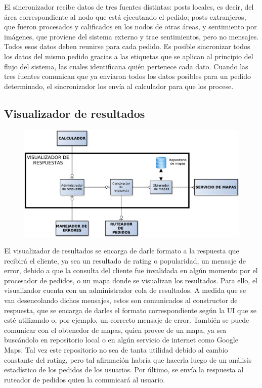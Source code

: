 El sincronizador recibe datos de tres fuentes distintas: posts locales, es decir, del área correspondiente al nodo que está ejecutando el pedido; posts extranjeros, que fueron procesados y calificados en los nodos de otras áreas, y sentimiento por imágenes, que proviene del sistema externo y trae sentimientos, pero no mensajes. Todos esos datos deben reunirse para cada pedido. Es posible sincronizar todos los datos del mismo pedido gracias a las etiquetas que se aplican al principio del flujo del sistema, las cuales identificana quién pertenece cada dato. Cuando las tres fuentes comunican que ya enviaron todos los datos posibles para un pedido determinado, el sincronizador los envía al calculador para que los procese.

\subsection{Visualizador de resultados}

\begin{figure}[H]
\centering
\includegraphics[width=\textwidth]{graph/visualizador.pdf}
\end{figure}

El visualizador de resultados se encarga de darle formato a la respuesta que recibirá el cliente, ya sea un resultado de rating o popularidad, un mensaje de error, debido a que la consulta del cliente fue invalidada en algún momento por el procesador de pedidos, o un mapa donde se visualizan los resultados. Para ello, el visualizador cuenta con un administrador cola de resultados. A medida que se van desencolando dichos mensajes, estos son comunicados al constructor de respuesta, que se encarga de darles el formato correspondiente según la UI que se esté utilizando o, por ejemplo, un correcto mensaje de error. También se puede comunicar con el obtenedor de mapas, quien provee de un mapa, ya sea buscándolo en repositorio local o en algún servicio de internet como Google Maps. Tal vez este repositorio no sea de tanta utilidad debido al cambio constante del rating, pero tal afirmación habría que hacerla luego de un análisis estadístico de los pedidos de los usuarios. Por último, se envía la respuesta al 
ruteador de pedidos quien la comunicará al usuario.
